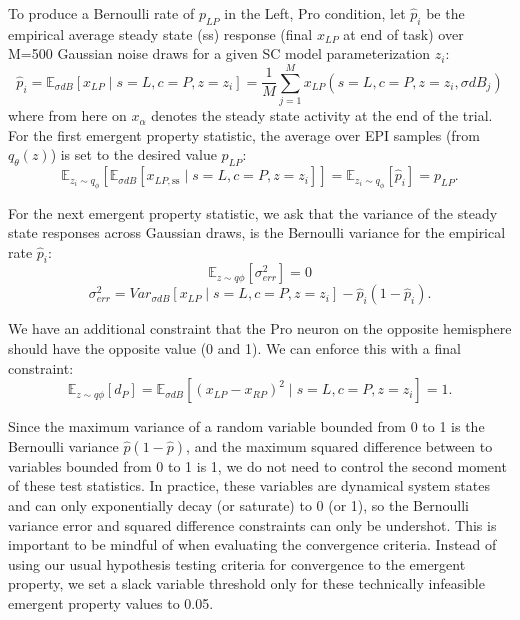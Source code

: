 \documentclass[11pt]{article}
\begin{document}
To produce a Bernoulli rate of $p_{LP}$ in the Left, Pro condition, let $\hat{p}_i$ be the empirical average steady state (ss) response (final $x_{LP}$ at end of task) over M=500 Gaussian noise draws for a given SC model parameterization $z_i$:
\begin{equation}
 \hat{p}_i = \mathbb{E}_{\sigma dB} \left[ x_{LP} \mid s=L, c=P, z=z_i \right] = \frac{1}{M}\sum_{j=1}^M x_{LP}(s=L, c=P, z=z_i, \sigma dB_j)
 \end{equation}
where from here on $x_\alpha$ denotes the steady state activity at the end of the trial.
For the first emergent property statistic, the average over EPI samples (from $q_\theta(z)$) is set to the desired value $p_{LP}$:
\begin{equation}
\mathbb{E}_{z_i \sim q_\phi} \left[ \mathbb{E}_{\sigma dB} \left[ x_{LP,\text{ss}} \mid s=L, c=P, z=z_i \right] \right] = \mathbb{E}_{z_i \sim q_\phi} \left[ \hat{p}_i \right] = p_{LP}.
\end{equation}

For the next emergent property statistic, we ask that the variance of the steady state responses across Gaussian draws, is the Bernoulli variance for the empirical rate $\hat{p}_i$:
\begin{equation}
\mathbb{E}_{z \sim q\phi} \left[ \sigma^2_{err} \right] = 0
\end{equation}
\begin{equation}
\sigma^2_{err} = Var_{\sigma dB} \left[ x_{LP} \mid s=L, c=P, z=z_i \right] - \hat{p}_i(1 - \hat{p}_i).
\end{equation}

We have an additional constraint that the Pro neuron on the opposite hemisphere should have the opposite value (0 and 1).  We can enforce this with a final constraint:
\begin{equation}
\mathbb{E}_{z \sim q\phi} \left[ d_P \right] = \mathbb{E}_{\sigma dB} \left[ (x_{LP} - x_{RP})^2  \mid s=L, c=P, z=z_i \right] = 1.
\end{equation}

Since the maximum variance of a random variable bounded from 0 to 1 is the Bernoulli variance $\hat{p}(1-\hat{p})$, and the maximum squared difference between to variables bounded from 0 to 1 is 1, we do not need to control the second moment of these test statistics.  In practice, these variables are dynamical system states and can only exponentially decay (or saturate) to 0 (or 1), so the Bernoulli variance error and squared difference constraints can only be undershot.  This is important to be mindful of when evaluating the convergence criteria.  Instead of using our usual hypothesis testing criteria for convergence to the emergent property, we set a slack variable threshold only for these technically infeasible emergent property values to 0.05.
\end{document}
